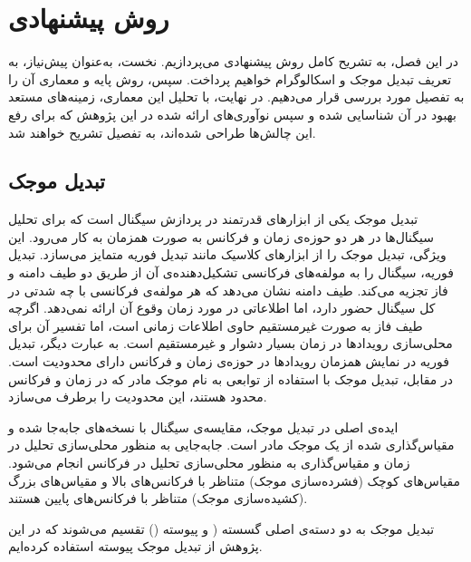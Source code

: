\chapter{روش پیشنهادی}
\clearpage

در این فصل، به تشریح کامل روش پیشنهادی می‌پردازیم. نخست، به‌عنوان پیش‌نیاز، به تعریف تبدیل موجک و
اسکالوگرام
خواهیم پرداخت. سپس، روش پایه و معماری آن را به تفصیل مورد بررسی قرار می‌دهیم. در نهایت، با تحلیل این معماری، زمینه‌های مستعد بهبود در آن شناسایی شده و سپس نوآوری‌های ارائه شده در این پژوهش که برای رفع این چالش‌ها طراحی شده‌اند، به تفصیل تشریح خواهند شد.

\section{تبدیل موجک}

تبدیل موجک یکی از ابزارهای قدرتمند در پردازش سیگنال است که برای تحلیل سیگنال‌ها در هر دو حوزه‌ی زمان و فرکانس به صورت همزمان به کار می‌رود. این ویژگی، تبدیل موجک را از ابزارهای کلاسیک مانند
تبدیل فوریه
متمایز می‌سازد. تبدیل فوریه، سیگنال را به مولفه‌های فرکانسی تشکیل‌دهنده‌ی آن از طریق دو طیف دامنه و فاز تجزیه می‌کند. طیف دامنه نشان می‌دهد که هر مولفه‌ی فرکانسی با چه شدتی در کل سیگنال حضور دارد، اما اطلاعاتی در مورد زمان وقوع آن ارائه نمی‌دهد. اگرچه طیف فاز به صورت غیرمستقیم حاوی اطلاعات زمانی است، اما تفسیر آن برای محلی‌سازی رویدادها در زمان بسیار دشوار و غیرمستقیم است. به عبارت دیگر، تبدیل فوریه در نمایش همزمان رویدادها در حوزه‌ی زمان و فرکانس دارای محدودیت است. در مقابل، تبدیل موجک با استفاده از توابعی به نام
موجک مادر
که در زمان و فرکانس محدود هستند، این محدودیت را برطرف می‌سازد.

ایده‌ی اصلی در تبدیل موجک، مقایسه‌ی سیگنال با نسخه‌های جابه‌جا شده و مقیاس‌گذاری شده از یک موجک مادر است. جابه‌جایی به منظور محلی‌سازی تحلیل در زمان و مقیاس‌گذاری به منظور محلی‌سازی تحلیل در فرکانس انجام می‌شود. مقیاس‌های کوچک (فشرده‌سازی موجک) متناظر با فرکانس‌های بالا و مقیاس‌های بزرگ (کشیده‌سازی موجک) متناظر با فرکانس‌های پایین هستند.

تبدیل موجک به دو دسته‌ی اصلی گسسته (
و پیوسته ()
تقسیم می‌شوند که در این پژوهش از تبدیل موجک پیوسته استفاده کرده‌ایم.

